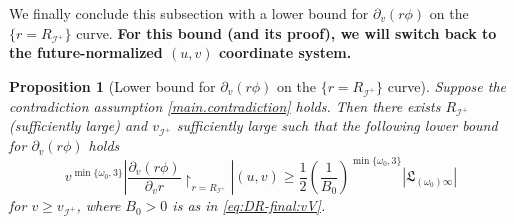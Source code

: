 \documentclass[10pt, reqno]{amsart}
\newtheorem{proposition}[theorem]{Proposition}
\theoremstyle{definition}
\theoremstyle{remark}
\theoremstyle{conjecture}
\numberwithin{equation}{section}
\newcommand{\rd}{\partial}
\newcommand{\0}{\emptyset}
\newcommand{\omg}{\omega}
\newcommand{\calI}{\mathcal I}
\newcommand{\f}{\frac}
\begin{document}
We finally conclude this subsection with a lower bound for $\rd_v(r\phi)$ on the $\{r=R_{\calI^+}\}$ curve. \textbf{For this bound (and its proof), we will switch back to the future-normalized $(u,v)$ coordinate system.}

\begin{proposition}[Lower bound for $\rd_v(r\phi)$ on the $\{r=R_{\calI^+}\}$ curve]\label{contra.lower}
Suppose the contradiction assumption \eqref{main.contradiction} holds. Then there exists $R_{\calI^+}$ (sufficiently large) and $v_{\calI^+}$ sufficiently large such that the following lower bound for $\rd_v(r\phi)$ holds
\begin{equation}\label{contra.lower.goal}
v^{\min\{\omg_0,3\}}\left|\f{\rd_v(r\phi)}{\rd_v r}\restriction_{r=R_{\calI^+}}\right|(u,v)\geq \f 12 \left(\f{1}{B_0}\right)^{\min\{\omg_0,3\}} \left|\mathfrak L_{(\omg_0)\infty}\right|
\end{equation}
for $v\geq v_{\calI^+}$, where $B_0>0$ is as in \eqref{eq:DR-final:vV}. 
\end{proposition}
\end{document}
